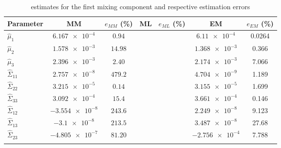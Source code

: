 \begin{longtable}{@{}lcccccc@{}} \toprule
	
	Parameter & MM & $e_{MM}$ (\%) & ML & $e_{ML}$ (\%) & EM & $e_{EM}$ (\%) \\ \midrule
	$\widehat{\mu}_{1}$  & $\num{6.167e-4}$ & $0.94$ &  & & $\num{6.11e-4}$ & 0.0264 \\ 
	\addlinespace[0.5em]
	$\widehat{\mu}_{2}$  & $\num{1.578e-3}$ & $14.98$ &  & & $\num{1.368e-3}$ & 0.366\\
	\addlinespace[0.5em]
	$\widehat{\mu}_{3}$  & $\num{2.396e-3}$ & $2.40$ &  & & $\num{2.174e-3}$ & 7.066\\
	\addlinespace[0.5em]
	$\widehat{\Sigma}_{11}$ &  $\num{2.757e-8}$ & $479.2$ &  & & $\num{4.704e-9}$ & 1.189   \\
	\addlinespace[0.5em]
	$\widehat{\Sigma}_{22}$ & $\num{3.215e-5}$ & $0.14$ &  & & $\num{3.155e-5}$ & 1.699   \\
	\addlinespace[0.5em]
	$\widehat{\Sigma}_{33}$ & $\num{3.092e-4}$  & $15.4$ &   & & $\num{3.661e-4}$ & 0.146  \\
	\addlinespace[0.5em]
	$\widehat{\Sigma}_{12}$ & $\num{-3.554e-8}$ & $243.6$  &  & & $\num{2.249e-8}$ & 9.123 \\
	\addlinespace[0.5em]
	$\widehat{\Sigma}_{13}$ & $\num{-3.1e-8}$  & $213.5$  &  & & $\num{3.487e-8}$ & 27.68  \\
	\addlinespace[0.5em]
	$\widehat{\Sigma}_{23}$ & $\num{-4.805e-7}$ & $81.20$  &  & & $\num{-2.756e-4}$ & 7.788  \\\bottomrule
	\addlinespace[0.5em]
	\caption{estimates for the first mixing component and respective estimation errors}
\end{longtable}
